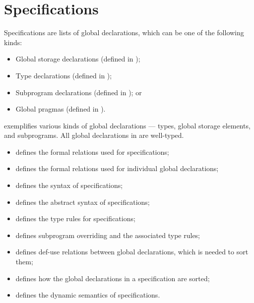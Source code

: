 \chapter{Specifications\label{chap:Specifications}}

\hypertarget{def-globaldeclarationterm}{}
Specifications are lists of global declarations,
which can be one of the following kinds:
\begin{itemize}
  \item Global storage declarations (defined in );
  \item Type declarations (defined in );
  \item Subprogram declarations (defined in ); or
  \item Global pragmas (defined in ).
\end{itemize}

 exemplifies various kinds of global declarations ---
types, global storage elements, and subprograms.
All global declarations in  are well-typed.

\ChapterOutline
\begin{itemize}
  \item {} defines the formal relations used for specifications;
  \item {} defines the formal relations used for individual
    global declarations;
  \item {} defines the syntax of specifications;
  \item {} defines the abstract syntax of specifications;
  \item {} defines the type rules for specifications;
  \item {} defines subprogram overriding and the associated type rules;
  \item {} defines def-use relations between global declarations,
        which is needed to sort them;
  \item {} defines how the global declarations in a specification are sorted;
  \item {} defines the dynamic semantics of specifications.
\end{itemize}

